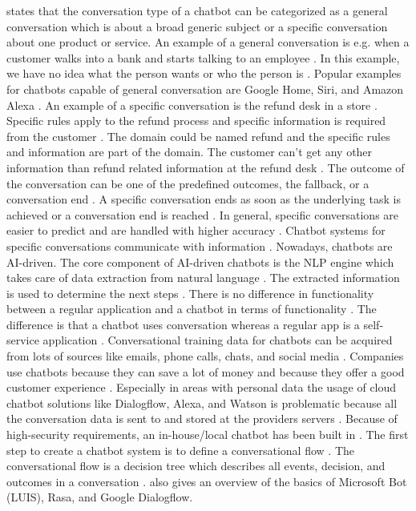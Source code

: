 \citet{singhbuilding} states that the conversation type of a chatbot can be categorized as a general conversation 
which is about a broad generic subject or a specific conversation about one product or service.
An example of a general conversation is e.g. when a customer walks into a bank and starts talking to an employee \cite{singhbuilding}.
In this example, we have no idea what the person wants or who the person is \cite{singhbuilding}.
Popular examples for chatbots capable of general conversation are Google Home, Siri, and Amazon Alexa \cite{singhbuilding}.
An example of a specific conversation is the refund desk in a store \cite{singhbuilding}. 
Specific rules apply to the refund process and specific information is required from the customer \cite{singhbuilding}.
The domain could be named refund and the specific rules and information are part of the domain. 
The customer can't get any other information than refund related information at the refund desk \cite{singhbuilding}. 
The outcome of the conversation can be one of the predefined outcomes, the fallback, or a conversation end \cite{singhbuilding}. 
A specific conversation ends as soon as the underlying task is achieved or a conversation end is reached \cite{singhbuilding}. 
In general, specific conversations are easier to predict and are handled with higher accuracy \cite{singhbuilding}.
Chatbot systems for specific conversations communicate with information \cite{singhbuilding}. 
Nowadays, chatbots are AI-driven.
The core component of AI-driven chatbots is the NLP engine which takes care of data extraction from natural language \cite{singhbuilding}.
The extracted information is used to determine the next steps \cite{singhbuilding}.
There is no difference in functionality between a regular application and a chatbot in terms of functionality \cite{singhbuilding}. 
The difference is that a chatbot uses conversation whereas a regular app is a self-service application \cite{singhbuilding}. 
Conversational training data for chatbots can be acquired from lots of sources like emails, phone calls, chats, and social media \cite{singhbuilding}.
Companies use chatbots because they can save a lot of money and because they offer a good customer experience \cite{singhbuilding}.
Especially in areas with personal data the usage of cloud chatbot solutions like Dialogflow, Alexa, and Watson 
is problematic because all the conversation data is sent to and stored at the providers servers \cite{singhbuilding}.
Because of high-security requirements, an in-house/local chatbot has been built in \citet{singhbuilding}.
The first step to create a chatbot system is to define a conversational flow \cite{singhbuilding}.
The conversational flow is a decision tree which describes all events, decision, and outcomes in a conversation \cite{singhbuilding}.
\citet{singhbuilding} also gives an overview of the basics of Microsoft Bot (LUIS), Rasa, and Google Dialogflow.

